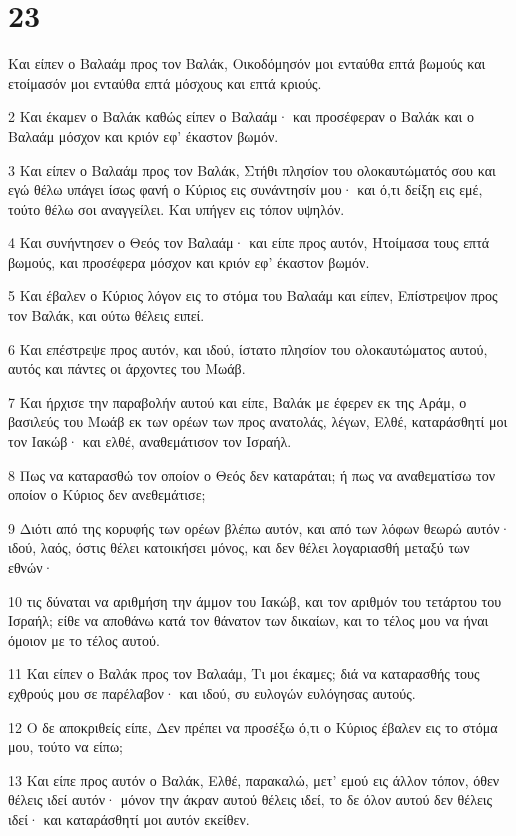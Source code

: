 \chapter{23}

\par Και είπεν ο Βαλαάμ προς τον Βαλάκ, Οικοδόμησόν μοι ενταύθα επτά βωμούς και ετοίμασόν μοι ενταύθα επτά μόσχους και επτά κριούς.
\par 2 Και έκαμεν ο Βαλάκ καθώς είπεν ο Βαλαάμ· και προσέφεραν ο Βαλάκ και ο Βαλαάμ μόσχον και κριόν εφ' έκαστον βωμόν.
\par 3 Και είπεν ο Βαλαάμ προς τον Βαλάκ, Στήθι πλησίον του ολοκαυτώματός σου και εγώ θέλω υπάγει ίσως φανή ο Κύριος εις συνάντησίν μου· και ό,τι δείξη εις εμέ, τούτο θέλω σοι αναγγείλει. Και υπήγεν εις τόπον υψηλόν.
\par 4 Και συνήντησεν ο Θεός τον Βαλαάμ· και είπε προς αυτόν, Ητοίμασα τους επτά βωμούς, και προσέφερα μόσχον και κριόν εφ' έκαστον βωμόν.
\par 5 Και έβαλεν ο Κύριος λόγον εις το στόμα του Βαλαάμ και είπεν, Επίστρεψον προς τον Βαλάκ, και ούτω θέλεις ειπεί.
\par 6 Και επέστρεψε προς αυτόν, και ιδού, ίστατο πλησίον του ολοκαυτώματος αυτού, αυτός και πάντες οι άρχοντες του Μωάβ.
\par 7 Και ήρχισε την παραβολήν αυτού και είπε, Βαλάκ με έφερεν εκ της Αράμ, ο βασιλεύς του Μωάβ εκ των ορέων των προς ανατολάς, λέγων, Ελθέ, καταράσθητί μοι τον Ιακώβ· και ελθέ, αναθεμάτισον τον Ισραήλ.
\par 8 Πως να καταρασθώ τον οποίον ο Θεός δεν καταράται; ή πως να αναθεματίσω τον οποίον ο Κύριος δεν ανεθεμάτισε;
\par 9 Διότι από της κορυφής των ορέων βλέπω αυτόν, και από των λόφων θεωρώ αυτόν· ιδού, λαός, όστις θέλει κατοικήσει μόνος, και δεν θέλει λογαριασθή μεταξύ των εθνών·
\par 10 τις δύναται να αριθμήση την άμμον του Ιακώβ, και τον αριθμόν του τετάρτου του Ισραήλ; είθε να αποθάνω κατά τον θάνατον των δικαίων, και το τέλος μου να ήναι όμοιον με το τέλος αυτού.
\par 11 Και είπεν ο Βαλάκ προς τον Βαλαάμ, Τι μοι έκαμες; διά να καταρασθής τους εχθρούς μου σε παρέλαβον· και ιδού, συ ευλογών ευλόγησας αυτούς.
\par 12 Ο δε αποκριθείς είπε, Δεν πρέπει να προσέξω ό,τι ο Κύριος έβαλεν εις το στόμα μου, τούτο να είπω;
\par 13 Και είπε προς αυτόν ο Βαλάκ, Ελθέ, παρακαλώ, μετ' εμού εις άλλον τόπον, όθεν θέλεις ιδεί αυτόν· μόνον την άκραν αυτού θέλεις ιδεί, το δε όλον αυτού δεν θέλεις ιδεί· και καταράσθητί μοι αυτόν εκείθεν.
